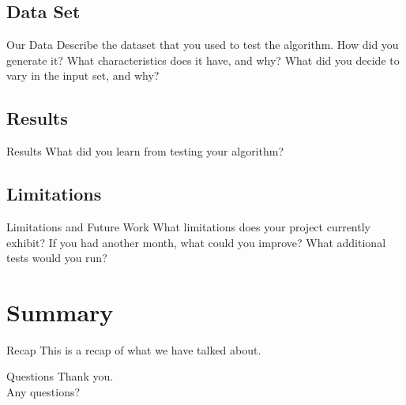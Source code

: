 \documentclass{beamer}
\begin{document}
\subsection{Data Set}
\begin{frame}{Our Data}
    Describe the dataset that you used to test the algorithm. How did you
    generate it? What characteristics does it have, and why? What did you
    decide to vary in the input set, and why?
\end{frame}

\subsection{Results}
\begin{frame}{Results}
    What did you learn from testing your algorithm?
\end{frame}

\subsection{Limitations}
\begin{frame}{Limitations and Future Work}
    What limitations does your project currently exhibit? If you had another
    month, what could you improve? What additional tests would you run?
\end{frame}


\section{Summary}\frame{\sectionpage}
\begin{frame}{Recap}
    This is a recap of what we have talked about.
\end{frame}

\begin{frame}{Questions}
    Thank you.\\
    Any questions?
\end{frame}
\end{document}
